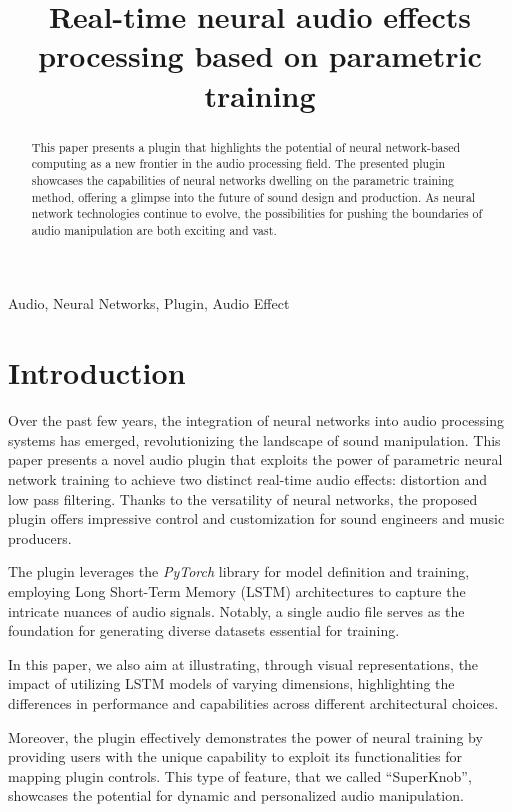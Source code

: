\documentclass{article}
\title{Real-time neural audio effects processing based on parametric training}
\newcommand{\quotes}[1]{``#1''}
\begin{document}
\ninept
\maketitle

\begin{sloppy}

\begin{abstract}
This paper presents a plugin that highlights the potential of neural network-based computing as a new frontier in the audio processing field. The presented plugin showcases the  capabilities of neural networks dwelling on the parametric training method, offering a glimpse into the future of sound design and production. As neural network technologies continue to evolve, the possibilities for pushing the boundaries of audio manipulation are both exciting and vast.
\end{abstract}

\begin{keywords}
Audio, Neural Networks, Plugin, Audio Effect
\end{keywords}

\section{Introduction}
\label{sec:intro}

Over the past few years, the integration of neural networks into audio processing systems has emerged, revolutionizing the landscape of sound manipulation. This paper presents a novel audio plugin that exploits the power of parametric neural network training to achieve two distinct real-time audio effects: distortion and low pass filtering. Thanks to the versatility of neural networks, the proposed plugin offers impressive control and customization for sound engineers and music producers.


The plugin leverages the \emph{PyTorch} library for model definition and training, employing Long Short-Term Memory (LSTM) architectures to capture the intricate nuances of audio signals. Notably, a single audio file serves as the foundation for generating diverse datasets essential for training.

In this paper, we also aim at illustrating, through visual representations, the impact of utilizing LSTM models of varying dimensions, highlighting the differences in performance and capabilities across different architectural choices.

Moreover, the plugin effectively demonstrates the power of neural training by providing users with the unique capability to exploit its functionalities for mapping plugin controls. This type of feature, that we called \quotes{SuperKnob}, showcases the potential for dynamic and personalized audio manipulation.


\end{sloppy}
\end{document}
